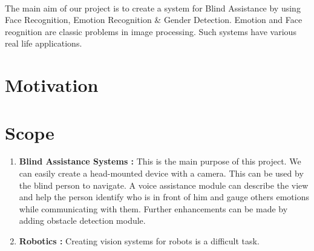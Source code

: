 \paragraph{}The main aim of our project is to create a system for Blind Assistance by using Face Recognition, Emotion Recognition \& Gender Detection. Emotion and Face reognition are classic problems in image processing. Such systems have various real life applications.

\section{Motivation}

\section{Scope}
\begin{enumerate}
	\item \textbf{Blind Assistance Systems :}\newline
	This is the main purpose of this project. We can easily create a head-mounted device with a camera. This can be used by the blind person to navigate. A voice assistance module can describe the view and help the person identify who is in front of him and gauge others emotions while communicating with them. Further enhancements can be made by adding obstacle detection module.
	
	\item \textbf{Robotics :}\newline
	Creating vision systems for robots is a difficult task. 
\end{enumerate}